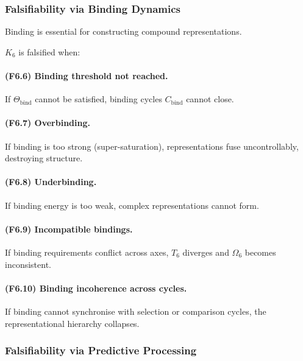 \subsubsection{Falsifiability via Binding Dynamics}

Binding is essential for constructing compound representations.

$K_6$ is falsified when:

\paragraph{(F6.6) Binding threshold not reached.}
If $\Theta_{\mathrm{bind}}$ cannot be satisfied,
binding cycles $C_{\mathrm{bind}}$ cannot close.

\paragraph{(F6.7) Overbinding.}
If binding is too strong (super-saturation),
representations fuse uncontrollably, destroying structure.

\paragraph{(F6.8) Underbinding.}
If binding energy is too weak,
complex representations cannot form.

\paragraph{(F6.9) Incompatible bindings.}
If binding requirements conflict across axes,
$T_6$ diverges and $\Omega_6$ becomes inconsistent.

\paragraph{(F6.10) Binding incoherence across cycles.}
If binding cannot synchronise with selection or comparison cycles,
the representational hierarchy collapses.



\subsubsection{Falsifiability via Predictive Processing}

